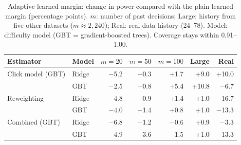 \begin{table}[t]
\centering
\caption{Adaptive learned margin: change in power compared with the plain learned margin (percentage points). $m$: number of past decisions; Large: history from five other datasets ($m\approx2{,}240$); Real: real-data history (24--78). Model: difficulty model (GBT = gradient-boosted trees). Coverage stays within 0.91--1.00.}
\label{tab:adaptive}
\footnotesize
\setlength{\tabcolsep}{3pt}
\begin{tabular}{llrrrrr}
\toprule
Estimator & Model & $m{=}20$ & $m{=}50$ & $m{=}100$ & Large & Real\\
\midrule
Click model (GBT) & Ridge & $-$5.2 & $-$0.3 & +1.7 & +9.0 & +10.0\\
 & GBT & $-$2.5 & +0.8 & +5.4 & +10.8 & $-$6.7\\
Reweighting & Ridge & $-$4.8 & +0.9 & +1.4 & +1.0 & $-$16.7\\
 & GBT & $-$4.0 & $-$1.4 & +0.8 & +1.0 & $-$13.3\\
Combined (GBT) & Ridge & $-$6.8 & $-$1.2 & $-$0.6 & +0.9 & $-$3.3\\
 & GBT & $-$4.9 & $-$3.6 & $-$1.5 & +1.0 & $-$13.3\\
\bottomrule
\end{tabular}
\end{table}
